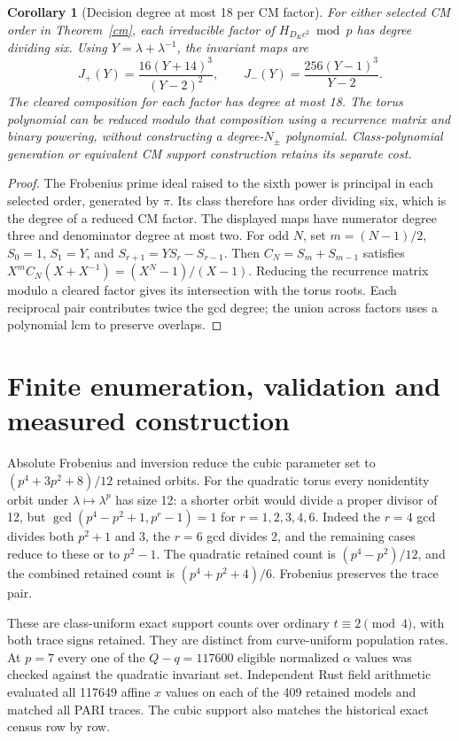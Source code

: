 \documentclass[11pt]{article}
\newtheorem{corollary}[theorem]{Corollary}
\begin{document}
\begin{corollary}[Decision degree at most 18 per CM factor]
For either selected CM order in Theorem~\ref{cm}, each irreducible factor
of $H_{D_Kc^2}\bmod p$ has degree dividing six. Using
$Y=\lambda+\lambda^{-1}$, the invariant maps are
\[
 J_+(Y)=\frac{16(Y+14)^3}{(Y-2)^2},\qquad
 J_-(Y)=\frac{256(Y-1)^3}{Y-2}.
\]
The cleared composition for each factor has degree at most 18. The torus
polynomial can be reduced modulo that composition using a recurrence matrix
and binary powering, without constructing a degree-$N_\pm$ polynomial.
Class-polynomial generation or equivalent CM support construction retains
its separate cost.
\end{corollary}
\begin{proof}
The Frobenius prime ideal raised to the sixth power is principal in each
selected order, generated by $\pi$. Its class therefore has order dividing
six, which is the degree of a reduced CM factor. The displayed maps have
numerator degree three and denominator degree at most two. For odd $N$, set
$m=(N-1)/2$, $S_0=1$, $S_1=Y$, and $S_{r+1}=YS_r-S_{r-1}$.
Then $C_N=S_m+S_{m-1}$ satisfies
$X^mC_N(X+X^{-1})=(X^N-1)/(X-1)$.
Reducing the recurrence matrix modulo a cleared factor gives its intersection
with the torus roots. Each reciprocal pair contributes twice the gcd degree;
the union across factors uses a polynomial lcm to preserve overlaps.
\end{proof}

\section{Finite enumeration, validation and measured construction}
Absolute Frobenius and inversion reduce the cubic parameter set to
$(p^4+3p^2+8)/12$ retained orbits. For the quadratic torus every nonidentity
orbit under $\lambda\mapsto\lambda^p$ has size 12: a shorter orbit would
divide a proper divisor of 12, but
$\gcd(p^4-p^2+1,p^r-1)=1$ for $r=1,2,3,4,6$.
Indeed the $r=4$ gcd divides both $p^2+1$ and 3, the $r=6$ gcd divides 2,
and the remaining cases reduce to these or to $p^2-1$.
The quadratic retained count is $(p^4-p^2)/12$, and the combined retained
count is $(p^4+p^2+4)/6$. Frobenius preserves the trace pair.

\begin{center}\end{center}
These are class-uniform exact support counts over ordinary
$t\equiv2\pmod4$, with both trace signs retained. They are distinct from
curve-uniform population rates. At $p=7$ every one of the $Q-q=117600$
eligible normalized $\alpha$ values was checked against the quadratic invariant
set. Independent Rust field arithmetic evaluated all 117649 affine $x$
values on each of the 409 retained models and matched all PARI traces.
The cubic support also matches the historical exact census row by row.
\end{document}
